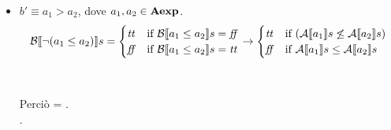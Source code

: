 {\begin{enumerate}[label=(\alph*)]
\begin{itemize}
    \item $ b' \equiv a_1 > a_2$, dove $a_1, a_2 \in \mbox{\textbf{Aexp}}$. \\
      \begin{align*} 
       \mathcal{B} \llbracket \lnot(a_1 \leq a_2) \rrbracket s = 
        \begin{cases}
        \mbox{\textit{tt}} &
        \mbox{if} \ \mathcal{B} \llbracket a_1 \leq a_2 \rrbracket s = \mbox{\textit{ff}} \\
        \mbox{\textit{ff}} & 
        \mbox{if} \ \mathcal{B} \llbracket a_1 \leq a_2 \rrbracket s = \mbox{\textit{tt}} \\
        \end{cases} 
        \rightarrow
        \begin{cases} 
        \mbox{\textit{tt}} & 
        \mbox{if} \ (\mathcal{A} \llbracket a_1 \rrbracket s \not \leq \mathcal{A} \llbracket a_2 \rrbracket s)\\ 
        \mbox{\textit{ff}} & 
        \mbox{if} \ \mathcal{A} \llbracket a_1 \rrbracket s \leq \mathcal{A} \llbracket a_2 \rrbracket s\\
        \end{cases} 
      \end{align*} \\ \\
      Perciò  = . \\.


\end{itemize}
\end{enumerate}}
